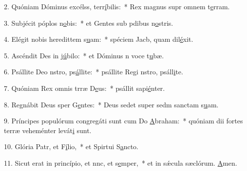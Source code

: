 2. Quóniam Dóminus excélss, terr\uline{í}bilis:~* Rex magnus supr omnem t\uline{e}rram.\par 
3. Subjécit póplos n\uline{o}bis:~* et Gentes sub pdibus n\uline{o}stris.\par 
4. Elégit nobis heredittem s\uline{u}am:~* spéciem Jacb, quam dil\uline{é}xit.\par 
5. Ascéndit Des in j\uline{ú}bilo:~* et Dóminus n voce t\uline{u}bæ.\par 
6. Psállite Deo nstro, ps\uline{á}llite:~* psállite Regi nstro, psáll\uline{i}te.\par 
7. Quóniam Rex omnis trræ D\uline{e}us:~* psállit sapi\uline{é}nter.\par 
8. Regnábit Deus sper G\uline{e}ntes:~* Deus sedet super sedm sanctam s\uline{u}am.\par 
9. Príncipes populórum congregáti sunt cum Do \uline{A}braham:~* quóniam dii fortes terræ veheménter levát\uline{i} sunt.\par 
10. Glória Patr, et F\uline{í}lio,~* et Spirtui S\uline{a}ncto.\par 
11. Sicut erat in princípio, et nnc, et s\uline{e}mper,~* et in sǽcula sæclórum. \uline{A}men.\par 
